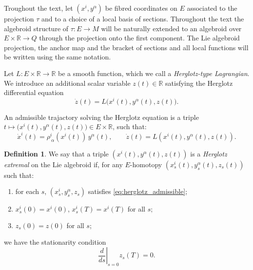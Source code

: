 \documentclass[11pt,a4paper]{article}
\theoremstyle{definition}
\newtheorem{definition}[theorem]{Definition}
\begin{document}

Troughout the text, let $(x^{i},y^{\alpha})$ be fibred coordinates on $E$ associated to the projection $\tau$ and to a choice of a local basis of sections. Throughout the text the algebroid structure of $\tau:E\to M$ will be naturally extended to an algebroid over $E\times \mathbb{R}\to Q$ through the projection onto the first component. The Lie algebroid projection, the anchor map and the bracket of sections and all local functions will be written using the same notation.

Let $L \colon E \times \mathbb{R} \to \mathbb{R}$ be a smooth function, which we call a \emph{Herglotz-type Lagrangian}.
We introduce an additional scalar variable $z(t)\in\mathbb{R}$ satisfying the Herglotz differential equation
\begin{equation}\label{eq:herglotz_z}
\dot z(t) = L\big(x^{i}(t),y^{\alpha}(t),z(t)\big).
\end{equation}

An admissible trajactory solving the Herglotz equation is a triple $t\mapsto \big(x^{i}(t),y^{\alpha}(t),z(t)\big)\in E\times\mathbb{R}$,
such that:
\begin{equation}\label{eq:herglotz_admissible}
\dot x^i(t) = \rho^i_{\ \alpha}(x^{i}(t))\,y^\alpha(t), \qquad
\dot z(t) = L(x^{i}(t),y^{\alpha}(t),z(t)).
\end{equation}

\begin{definition}
We say that a triple $(x^{i}(t),y^{\alpha}(t),z(t))$ is a \emph{Herglotz extremal} on
the Lie algebroid if, for any $E$-homotopy $(x^{i}_s(t),y^{\alpha}_s(t),z_s(t))$
such that:
\begin{enumerate}
   \item for each $s$, $(x^{i}_s,y^{\alpha}_s,z_s)$ satisfies \eqref{eq:herglotz_admissible};
  \item $x^{i}_s(0)=x^{i}(0)$, $x^{i}_s(T)=x^{i}(T)$ for all $s$;
  \item $z_s(0)=z(0)$ for all $s$;
\end{enumerate}
we have the stationarity condition
\begin{equation}\label{eq:stationary}
\left.\frac{d}{ds}\right|_{s=0} z_s(T) = 0.
\end{equation}
\end{definition}
\end{document}
